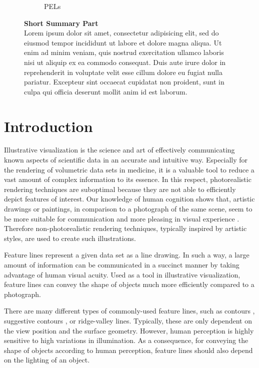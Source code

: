 \documentclass[9pt,fleqn,twoside,twocolumn]{stdglobal}
\begin{document}
\begin{figure}
\begin{subfigure}[b]{0.24\textwidth}
      \caption{PELs}
    \end{subfigure}%
    \caption{\textbf{Short Summary Part}\\
    Lorem ipsum dolor sit amet, consectetur adipisicing elit, sed do eiusmod
    tempor incididunt ut labore et dolore magna aliqua. Ut enim ad minim veniam,
    quis nostrud exercitation ullamco laboris nisi ut aliquip ex ea commodo
    consequat. Duis aute irure dolor in reprehenderit in voluptate velit esse
    cillum dolore eu fugiat nulla pariatur. Excepteur sint occaecat cupidatat non
    proident, sunt in culpa qui officia deserunt mollit anim id est laborum.}
  \end{figure}

\section{Introduction}
  Illustrative visualization is the science and art of effectively communicating known aspects of scientific data in an accurate and intuitive way.
  Especially for the rendering of volumetric data sets in medicine, it is a valuable tool to reduce a vast amount of complex information to its essence.
  In this respect, photorealistic rendering techniques are suboptimal because they are not able to efficiently depict features of interest.
  Our knowledge of human cognition shows that, artistic drawings or paintings, in comparison to a photograph of the same scene, seem to be more suitable for communication and more pleasing in visual experience \autocite{xie2007}.
  Therefore non-photorealistic rendering techniques, typically inspired by artistic styles, are used to create such illustrations.

  Feature lines represent a given data set as a line drawing.
  In such a way, a large amount of information can be communicated in a succinct manner by taking advantage of human visual acuity.
  Used as a tool in illustrative visualization, feature lines can convey the shape of objects much more efficiently compared to a photograph.

  There are many different types of commonly-used feature lines, such as contours \autocite{isenberg2003}, suggestive contours \autocite{decarlo2003}, or ridge-valley lines.
  Typically, these are only dependent on the view position and the surface geometry.
  However, human perception is highly sensitive to high variations in illumination.
  As a consequence, for conveying the shape of objects according to human perception, feature lines should also depend on the lighting of an object.
\end{document}
